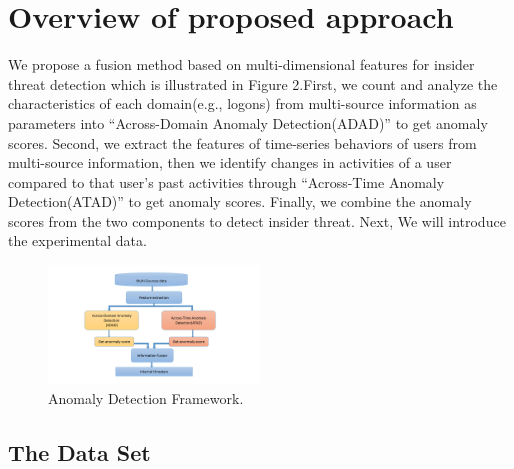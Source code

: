\documentclass[conference]{IEEEtran}
\begin{document}
\section{Overview of proposed approach}

We propose a fusion method based on multi-dimensional features for insider threat detection which is illustrated in Figure 2.First, we count and analyze the characteristics of each domain(e.g., logons) from multi-source information as parameters into “Across-Domain Anomaly Detection(ADAD)” to get anomaly scores. Second, we extract the features of time-series behaviors of users from multi-source information, then we identify changes in activities of a user compared to that user’s past activities through “Across-Time Anomaly Detection(ATAD)” to get anomaly scores. Finally, we combine the anomaly scores from the two components to detect insider threat. Next, We will introduce the experimental data. 


\begin{figure}[htb]
\centerline{\includegraphics[width = 0.5\textwidth]{figure/figure2.png}}
\caption{Anomaly Detection Framework.}
\label{fig}
\end{figure}

\subsection{The Data Set}
\end{document}
